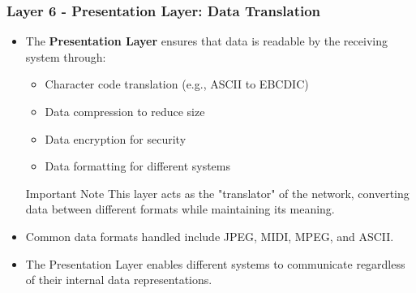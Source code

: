 \documentclass{beamer}
\begin{document}
\begin{frame}
    \frametitle{Layer 6 - Presentation Layer: Data Translation}
    
    \begin{itemize}
        \item The \textbf{Presentation Layer} ensures that data is readable by the receiving system through:
        \begin{itemize}
            \item Character code translation (e.g., ASCII to EBCDIC)
            \item Data compression to reduce size
            \item Data encryption for security
            \item Data formatting for different systems
        \end{itemize}
        
        \begin{alertblock}{Important Note}
            This layer acts as the "translator" of the network, converting data between different formats while maintaining its meaning.
        \end{alertblock}
        
        \item Common data formats handled include JPEG, MIDI, MPEG, and ASCII.
        
        \item The Presentation Layer enables different systems to communicate regardless of their internal data representations.
    \end{itemize}
\end{frame}
\end{document}

